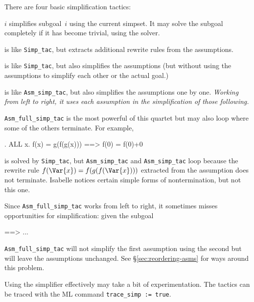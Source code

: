 There are four basic simplification tactics:
\begin{ttdescription}
\item[\ttindexbold{Simp_tac} $i$] simplifies subgoal~$i$ using the current
  simpset.  It may solve the subgoal completely if it has become trivial,
  using the solver.
  
\item[\ttindexbold{Asm_simp_tac}]
  is like \verb$Simp_tac$, but extracts additional rewrite rules from the
  assumptions.

\item[\ttindexbold{Full_simp_tac}] is like \verb$Simp_tac$, but also
  simplifies the assumptions (but without using the assumptions to simplify
  each other or the actual goal.)

\item[\ttindexbold{Asm_full_simp_tac}]
  is like \verb$Asm_simp_tac$, but also simplifies the assumptions one by
  one.  {\em Working from left to right, it uses each assumption in the
  simplification of those following.}
\end{ttdescription}

{\tt Asm_full_simp_tac} is the most powerful of this quartet but may also
loop where some of the others terminate. For example,
\begin{ttbox}
{. ALL x. f(x) = g(f(g(x))) ==> f(0) = f(0)+0}
\end{ttbox}
is solved by {\tt Simp_tac}, but {\tt Asm_simp_tac} and {\tt Asm_simp_tac}
loop because the rewrite rule $f(\Var{x}) = f(g(f(\Var{x})))$ extracted from
the assumption does not terminate. Isabelle notices certain simple forms of
nontermination, but not this one.
 
\begin{warn}
  Since \verb$Asm_full_simp_tac$ works from left to right, it sometimes
misses opportunities for simplification: given the subgoal
\begin{ttbox}
{\out [| P(f(a)); f(a) = t |] ==> ...}
\end{ttbox}
\verb$Asm_full_simp_tac$ will not simplify the first assumption using the
second but will leave the assumptions unchanged. See
\S\ref{sec:reordering-asms} for ways around this problem.
\end{warn}

Using the simplifier effectively may take a bit of experimentation.  The
tactics can be traced with the ML command \verb$trace_simp := true$.

